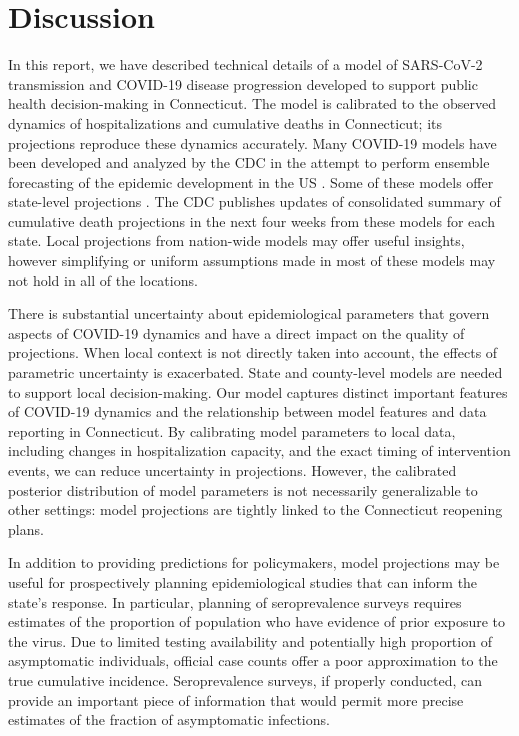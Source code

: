 \documentclass[11pt]{article}
\begin{document}

\section{Discussion}

In this report, we have described technical details of a model of SARS-CoV-2 transmission and COVID-19 disease progression developed to support public health decision-making in Connecticut.  The model is calibrated to the observed dynamics of hospitalizations and cumulative deaths in Connecticut; its projections reproduce these dynamics accurately.  Many COVID-19 models have been developed and analyzed by the CDC in the attempt to perform ensemble forecasting of the epidemic development in the US \citep{cdc2020covid19forecasts}. Some of these models offer state-level projections \citep{imperial2020state, covidactnow2020you, gleam2020projections, columbia2020projections, ihme2020projections, losalamos2020projections, mit2020projections, ucla2020projections, umassamherst2020projections, utaustin2020projections, yyg2020projections}.  The CDC publishes updates of consolidated summary of cumulative death projections in the next four weeks from these models for each state. Local projections from nation-wide models may offer useful insights, however simplifying or uniform assumptions made in most of these models may not hold in all of the locations. 

There is substantial uncertainty about epidemiological parameters that govern aspects of COVID-19 dynamics and have a direct impact on the quality of projections. When local context is not directly taken into account, the effects of parametric uncertainty is exacerbated.  State and county-level models are needed to support local decision-making.  Our model captures distinct important features of COVID-19 dynamics and the relationship between model features and data reporting in Connecticut.  By calibrating model parameters to local data, including changes in hospitalization capacity, and the exact timing of intervention events, we can reduce uncertainty in projections. However, the calibrated posterior distribution of model parameters is not necessarily generalizable to other settings: model projections are tightly linked to the Connecticut reopening plans. 

In addition to providing predictions for policymakers, model projections may be useful for prospectively planning epidemiological studies that can inform the state's response.  In particular, planning of seroprevalence surveys requires estimates of the proportion of population who have evidence of prior exposure to the virus. Due to limited testing availability and potentially high proportion of asymptomatic individuals, official case counts offer a poor approximation to the true cumulative incidence. Seroprevalence surveys, if properly conducted, can provide an important piece of information that would permit more precise estimates of the fraction of asymptomatic infections. 
\end{document}
